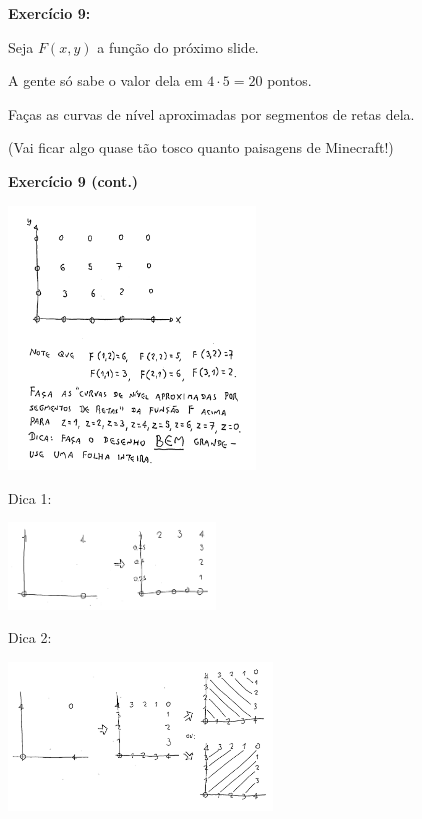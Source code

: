 \documentclass[oneside,12pt]{article}
\begin{document}
\msk

{\bf Exercício 9:}

Seja $F(x,y)$ a função do próximo slide.

A gente só sabe o valor dela em $4·5=20$ pontos.

Faças as curvas de nível aproximadas por segmentos de retas dela.

(Vai ficar algo quase tão tosco quanto paisagens de Minecraft!)

\newpage

{\bf Exercício 9 (cont.)}



\includegraphics[height=7cm]{2020-2-C3/20210317_curva_de_nivel.pdf}

\newpage


Dica 1:


\includegraphics[width=5.5cm]{2020-2-C3/20210317_curvas_de_nivel_2.pdf}

Dica 2:

\includegraphics[width=7cm]{2020-2-C3/20210317_curvas_de_nivel_3.pdf}
\end{document}
